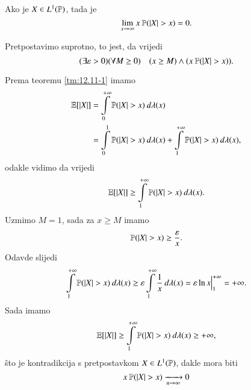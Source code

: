 \begin{zad} \label{zad:12.12}
    Ako je $X \in L^1(\mathbb{P})$, tada je
    \begin{equation*}
        \lim\limits_{x \to \infty} x \: \mathbb{P}({|X| > x}) = 0.
    \end{equation*}
\end{zad}

\begin{rj}[\ref{zad:12.12}]
    Pretpostavimo suprotno, to jest, da vrijedi
    \begin{equation*}
        (\exists \varepsilon > 0)(\forall M \geq 0) \quad  (x \geq M ) \land (x \: \mathbb{P} (|X| > x)).
    \end{equation*}

    Prema teoremu \ref{tm:12.11-1} imamo
    \begin{equation*}
        \begin{aligned}
            \mathbb{E} [|X|] &= \int\limits_{0}^{+\infty} \mathbb{P} (|X| > x) \: d \lambda (x)\\
            &= \int\limits_{0}^{1} \mathbb{P} (|X| > x) \: d \lambda (x) + \int\limits_{1}^{+\infty} \mathbb{P} (|X| > x) \: d \lambda (x),
        \end{aligned}
    \end{equation*}
    odakle vidimo da vrijedi
    \begin{equation*}
        \mathbb{E} [|X|] \geq \int\limits_{1}^{+\infty} \mathbb{P} (|X| > x) \: d \lambda (x).
    \end{equation*}
    Uzmimo $M = 1$, sada za $x \geq M$ imamo
    \begin{equation*}
        \mathbb{P} (|X| > x) \geq \frac{\varepsilon}{x}.
    \end{equation*}
    Odavde slijedi
    \begin{equation*}
        \int\limits_{1}^{+\infty} \mathbb{P} (|X| > x) \: d \lambda (x) \geq \varepsilon \int\limits_{1}^{+\infty} \frac{1}{x} \: d \lambda (x) = \varepsilon \ln x \Big|_{1}^{+\infty} = +\infty.
    \end{equation*}
    Sada imamo
    \begin{equation*}
        \mathbb{E} [|X|] \geq \int\limits_{1}^{+\infty} \mathbb{P} (|X| > x) \: d \lambda (x) \geq +\infty,
    \end{equation*}
    \v sto je kontradikcija s pretpostavkom $X \in L^1(\mathbb{P})$, dakle mora biti
    \begin{equation*}
        x \: \mathbb{P} (|X| > x) \xrightarrow[n \to \infty]{} 0
    \end{equation*}
\end{rj}

